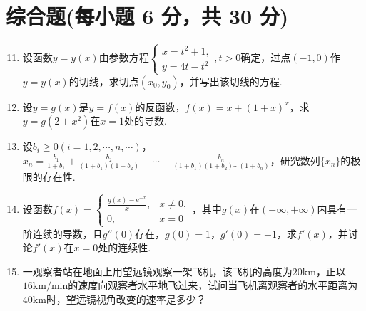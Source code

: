 \documentclass[../main.tex]{subfiles}
\begin{document}
\section{综合题(每小题 6 分，共 30 分)}
\begin{enumerate}
    \setcounter{enumi}{10}
    \item 设函数$y=y(x)$由参数方程$\begin{cases}
                  x=t^{2}+1, \\
                  y=4t-t^{2}
              \end{cases},t>0$确定，过点$(-1,0)$作$y=y(x)$的切线，求切点$(x_{0},y_{0})$，并写出该切线的方程.
          \vspace{10em}

    \item 设$y=g(x)$是$y=f(x)$的反函数，$f(x)=x+(1+x)^{x}$，求$y=g(2+x^{2})$在$x
              =1$处的导数.
          \vspace{10em}

    \item 设$b_{i}\geq0(i=1,2,\cdots,n,\cdots)$，$x_{n}=\frac{b_{1}}{1+b_{1}}
              +\frac{b_{2}}{(1+b_{1})(1+b_{2})}+\cdots+\frac{b_{n}}{(1+b_{1})(1+b_{2})\cdots(1+b_{n})}$，研究数列$\{
              x_{n}\}$的极限的存在性.
          \vspace{8em}

    \item 设函数$f(x)=
              \begin{cases}
                  \frac{g(x)-\mathrm{e}^{-x}}{x}, & x\neq0, \\
                  0,                              & x=0
              \end{cases}$，其中$g(x)$在$(-\infty,+\infty)$内具有一阶连续的导数，且$g''(0
              )$存在，$g(0)=1$，$g'(0)=-1$，求$f'(x)$，并讨论$f'(x)$在$x=0$处的连续性.
          \vspace{8em}

    \item 一观察者站在地面上用望远镜观察一架飞机，该飞机的高度为$20\mathrm{km}$，正以$1
              6\mathrm{km/min}$的速度向观察者水平地飞过来，试问当飞机离观察者的水平距离为$4
              0\mathrm{km}$时，望远镜视角改变的速率是多少？
          \vspace{8em}
\end{enumerate}
\end{document}
